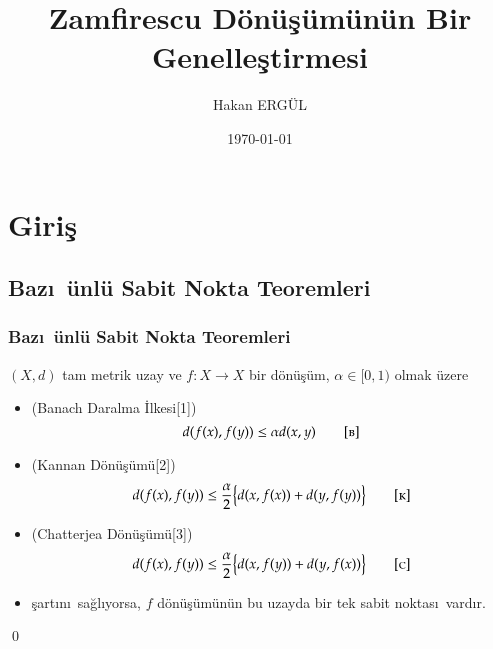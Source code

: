 \documentclass[8pt]{beamer}
\title{Zamfirescu D\"on\"u\c{s}\"um\"un\"un Bir Genelle\c{s}tirmesi}
\author{Hakan ERG\"UL}
\institute{Atat\"{u}rk \"{U}niversitesi}
\date{\today}
\begin{document}
\begin{frame}
\titlepage
\end{frame}

\section{Giri\c{s}}
\subsection{Baz\i \ \"{u}nl\"{u} Sabit Nokta Teoremleri}

\begin{frame}
\frametitle{Baz\i \ \"{u}nl\"{u} Sabit Nokta Teoremleri}
   $(X,d)$  tam metrik uzay ve $f: X \rightarrow X$ bir d\"{o}n\"{u}\c{s}\"{u}m, $\alpha \in [0,1)$ olmak \"{u}zere 
   \begin{itemize}[<+-| alert@+>]

   \item (Banach Daralma \.{I}lkesi[1])
     \begin{equation} 
       d(f(x), f(y))\leq \alpha d(x,y)
\tag*{\textsc{[b]}}
        \end{equation}
   \item (Kannan D\"{o}n\"{u}\c{s}\"{u}m\"{u}[2])
     \begin{equation} 
       d(f(x), f(y))\leq \frac{\alpha}{2}\big\{ d(x,f(x))+d(y,f(y))\big\}
\tag*{\textsc{[k]}}
         \end{equation}
   \item (Chatterjea D\"{o}n\"{u}\c{s}\"{u}m\"{u}[3])
     \begin{equation} 
       d(f(x), f(y))\leq \frac{\alpha}{2}\big\{ d(x,f(y))+d(y,f(x))\big\}
\tag*{\textsc{[c]}}
         \end{equation}
\item[] \c{s}art\i n\i\ sa\u{g}l\i yorsa, $f$ d\"{o}n\"{u}\c{s}\"{u}m\"{u}n\"{u}n bu uzayda bir tek sabit noktas\i\ vard\i r.

   \end{itemize}

    \qed
\end{frame}%
\end{document}
